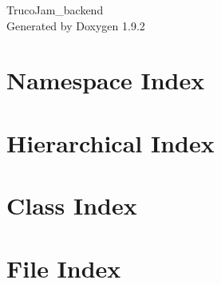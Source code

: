 \documentclass[twoside]{book}
\newcommand{\+}{\discretionary{\mbox{\scriptsize$\hookleftarrow$}}{}{}}
\newcommand{\clearemptydoublepage}{%
    \newpage{\pagestyle{empty}\cleardoublepage}%
  }
\begin{document}
  \raggedbottom
    \hypersetup{pageanchor=false,
                bookmarksnumbered=true,
                pdfencoding=unicode
               }
  \begin{titlepage}
  \vspace*{7cm}
  \begin{center}%
  {\Large Truco\+Jam\+\_\+backend}\\
  \vspace*{1cm}
  {\large Generated by Doxygen 1.9.2}\\
  \end{center}
  \end{titlepage}
  \clearemptydoublepage
  \tableofcontents
  \clearemptydoublepage
  \hypersetup{pageanchor=true}
\chapter{Namespace Index}

\chapter{Hierarchical Index}

\chapter{Class Index}

\chapter{File Index}

\end{document}
